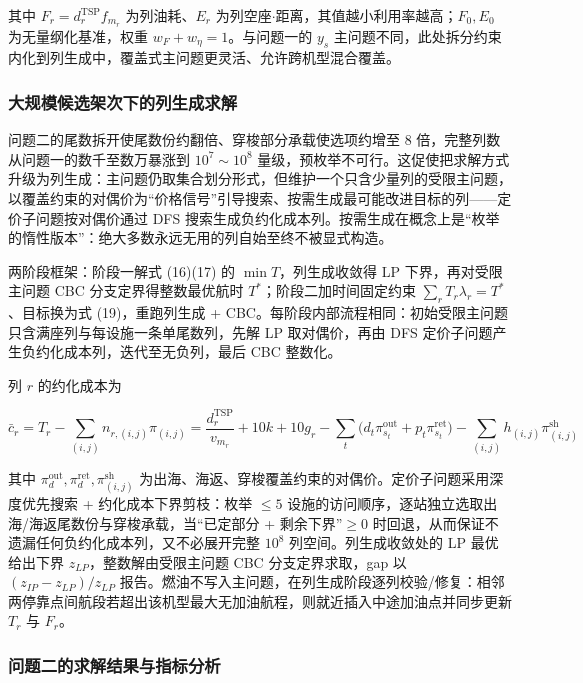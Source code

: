 \documentclass[UTF8,zihao=-4]{ctexart}
\numberwithin{figure}{section}
\numberwithin{table}{section}
\begin{document}
其中 $F_r=d_r^{\mathrm{TSP}}f_{m_r}$ 为列油耗、$E_r$ 为列空座$\cdot$距离，其值越小利用率越高；$F_0,E_0$ 为无量纲化基准，权重 $w_F+w_\eta=1$。与问题一的 $y_s$ 主问题不同，此处拆分约束内化到列生成中，覆盖式主问题更灵活、允许跨机型混合覆盖。

\subsubsection{大规模候选架次下的列生成求解}

问题二的尾数拆开使尾数份约翻倍、穿梭部分承载使选项约增至 8 倍，完整列数从问题一的数千至数万暴涨到 $10^7\sim10^8$ 量级，预枚举不可行。这促使把求解方式升级为列生成\cite{ref:cg,ref:primer}：主问题仍取集合划分形式，但维护一个只含少量列的受限主问题，以覆盖约束的对偶价为“价格信号”引导搜索、按需生成最可能改进目标的列——定价子问题按对偶价通过 DFS 搜索生成负约化成本列。按需生成在概念上是“枚举的惰性版本”：绝大多数永远无用的列自始至终不被显式构造。

两阶段框架：阶段一解式 (16)(17) 的 $\min T$，列生成收敛得 LP 下界，再对受限主问题 CBC 分支定界得整数最优航时 $T^*$；阶段二加时间固定约束 $\sum_r T_r\lambda_r=T^*$、目标换为式 (19)，重跑列生成 + CBC。每阶段内部流程相同：初始受限主问题只含满座列与每设施一条单尾数列，先解 LP 取对偶价，再由 DFS 定价子问题产生负约化成本列，迭代至无负列，最后 CBC 整数化。

列 $r$ 的约化成本为

\begin{equation}
  \bar c_r=T_r-\sum_{(i,j)}n_{r,(i,j)}\pi_{(i,j)}
  =\frac{d_r^{\mathrm{TSP}}}{v_{m_r}}+10k+10g_r-\sum_{t}\big(d_t\pi^{\mathrm{out}}_{s_t}+p_t\pi^{\mathrm{ret}}_{s_t}\big)-\sum_{(i,j)}h_{(i,j)}\pi^{\mathrm{sh}}_{(i,j)}
\end{equation}

其中 $\pi^{\mathrm{out}}_d,\pi^{\mathrm{ret}}_d,\pi^{\mathrm{sh}}_{(i,j)}$ 为出海、海返、穿梭覆盖约束的对偶价。定价子问题采用深度优先搜索 + 约化成本下界剪枝：枚举 $\le5$ 设施的访问顺序，逐站独立选取出海/海返尾数份与穿梭承载，当“已定部分 + 剩余下界”$\ge0$ 时回退，从而保证不遗漏任何负约化成本列，又不必展开完整 $10^8$ 列空间。列生成收敛处的 LP 最优给出下界 $z_{LP}$，整数解由受限主问题 CBC 分支定界求取，gap 以 $(z_{IP}-z_{LP})/z_{LP}$ 报告。燃油不写入主问题，在列生成阶段逐列校验/修复：相邻两停靠点间航段若超出该机型最大无加油航程，则就近插入中途加油点并同步更新 $T_r$ 与 $F_r$。

\subsubsection{问题二的求解结果与指标分析}
\end{document}
